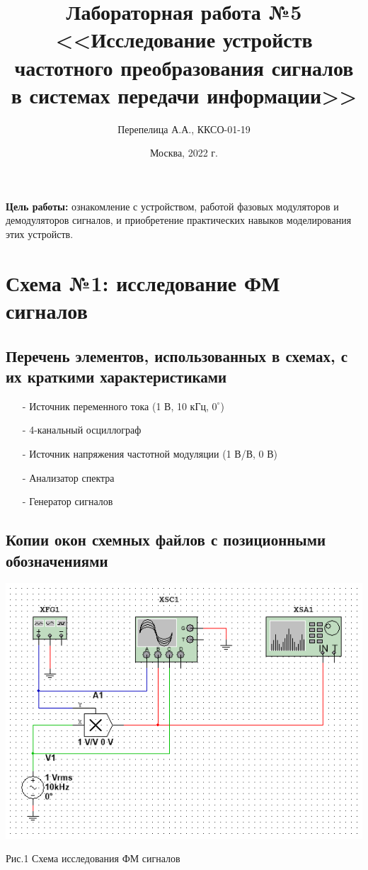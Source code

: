 \documentclass[11pt]{article}
\title{\textbf{Лабораторная работа №5\\<<Исследование устройств частотного преобразования сигналов в системах передачи информации>>}}
\author{Перепелица А.А., ККСО-01-19}
\date{Москва, 2022 г.}
\begin{document}
\maketitle
\thispagestyle{empty}
\textbf{Цель работы:} ознакомление с устройством, работой фазовых модуляторов и демодуляторов сигналов, и приобретение практических навыков  моделирования этих устройств. 

\section{Схема №1: исследование ФМ сигналов}
\subsection{Перечень элементов, использованных в схемах, с
их краткими характеристиками}
\begin{itemize}
    \item[-] Источник переменного тока (1 В, 10 кГц, $0^\circ$)
    \item[-] 4-канальный осциллограф
    \item[-] Источник напряжения частотной модуляции (1 В/В, 0 В)
    \item[-] Анализатор спектра
    \item[-] Генератор сигналов 
\end{itemize}


\subsection{Копии окон схемных файлов с позиционными обозначениями}
\includegraphics[width=1\linewidth]{img/scheme1.png}
\begin{center}
    Рис.1 Схема исследования ФМ сигналов
\end{center}
\end{document}
